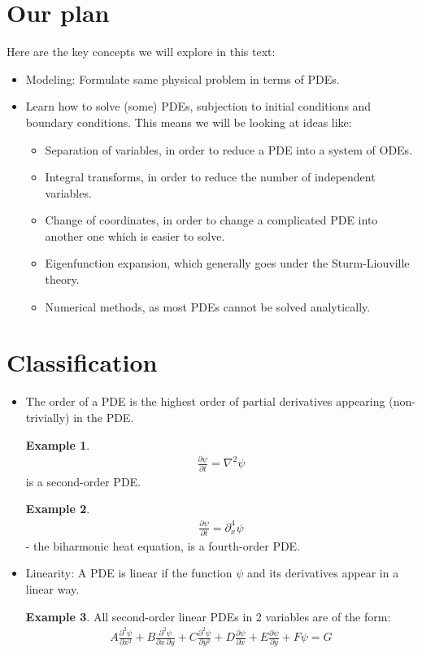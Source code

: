 \documentclass{book}
\theoremstyle{definition}
\newtheorem{exmp}{Example}[section]
\begin{document}
\section{Our plan}
Here are the key concepts we will explore in this text:
\begin{itemize}
	\item Modeling: Formulate same physical problem in terms of PDEs.
	\item Learn how to solve (some) PDEs, subjection to initial conditions and boundary conditions. This means we will be looking at ideas like:
	\begin{itemize}
		\item Separation of variables, in order to reduce a PDE into a system of ODEs.
		\item Integral transforms, in order to reduce the number of independent variables.
		\item Change of coordinates, in order to change a complicated PDE into another one which is easier to solve.
		\item Eigenfunction expansion, which generally goes under the Sturm-Liouville theory.
		\item Numerical methods, as most PDEs cannot be solved analytically. 
	\end{itemize}
\end{itemize}

\section{Classification}
\begin{itemize}
	\item The order of a PDE is the highest order of partial derivatives appearing (non-trivially) in the PDE.
	\begin{exmp}
		\begin{align*}
		\frac{\partial \psi}{\partial t} = \nabla^2\psi
		\end{align*}
		is a second-order PDE.
	\end{exmp}
	\begin{exmp}
		\begin{align*}
		\frac{\partial \psi}{\partial t} = \partial^4_x\psi
		\end{align*}
		- the biharmonic heat equation, is a fourth-order PDE.
	\end{exmp}
	\item Linearity: A PDE is linear if the function $\psi$ and its derivatives appear in a linear way.
	\begin{exmp}
		All second-order linear PDEs in 2 variables are of the form:
		\begin{align*}
		\boxed{A\frac{\partial^2 \psi}{\partial x^2} + B\frac{\partial^2 \psi}{\partial x\,\partial y} + C\frac{\partial^2 \psi}{\partial y^2} + D\frac{\partial \psi}{\partial x} + E\frac{\partial \psi}{\partial y} + F\psi = G}
		\end{align*}
	\end{exmp}
\end{itemize}
\end{document}
